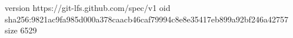 version https://git-lfs.github.com/spec/v1
oid sha256:9821ac9fa985d000a378caacb46caf79994c8e8e35417eb899a92bf246a42757
size 6529
